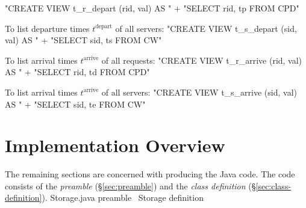 \documentclass{article}
\def\nwendcode{\endtrivlist \endgroup}
\let\nwdocspar=\par
\theoremstyle{definition}
\begin{document}
\nwenddocs{}\endmoddef{}
"CREATE VIEW t_r_depart (rid, val) AS "
  + "SELECT rid, tp FROM CPD"
\nwendcode{}\nwdocspar
To list departure times $t^\textrm{depart}$ of all servers:
\nwenddocs{}\endmoddef{}
"CREATE VIEW t_s_depart (sid, val) AS "
  + "SELECT sid, ts FROM CW"
\nwendcode{}\nwdocspar
To list arrival times $t^\textrm{arrive}$ of all requests:
\nwenddocs{}\endmoddef{}
"CREATE VIEW t_r_arrive (rid, val) AS "
  + "SELECT rid, td FROM CPD"
\nwendcode{}\nwdocspar
To list arrival times $t^\textrm{arrive}$ of all servers:
\nwenddocs{}\endmoddef{}
"CREATE VIEW t_s_arrive (sid, val) AS "
  + "SELECT sid, te FROM CW"
\nwendcode{}\nwdocspar

\section{Implementation Overview}
\label{sec:implementation-overview}
The remaining sections are concerned with producing the Java code.  The code
consists of the \emph{preamble} (\S\ref{sec:preamble}) and the \emph{class
definition} (\S\ref{sec:class-definition}).
\nwenddocs{}\endmoddef{}
  \LA{}Storage.java preamble~{\nwtagstyle{}}\RA{}
  \LA{}\code{}Storage\edoc{} definition~{\nwtagstyle{}}\RA{}
\nwendcode{}\nwdocspar
\end{document}
